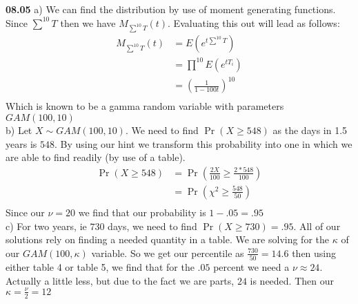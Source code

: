 {\bf 08.05} a) We can find the distribution by use of moment generating functions. Since $\sum^{10} T$ then we
have $M_{\sum^{10} T} (t)$. Evaluating this out will lead as follows:
\begin{align*}
	M_{\sum^{10} T} (t) & = E \left( e^{t \sum^{10} T} \right) \\
	& = \prod^{10} E \left( e^{ t T_{i}} \right) \\
	& = \left( \frac{1}{1-100t} \right)^{10} \\
\end{align*}
Which is known to be a gamma random variable with parameters $GAM(100,10)$ \\

b) Let $X \sim GAM(100,10)$.
We need to find $\Pr \left( X \geq 548 \right)$ as the days in 1.5 years is $548$. By using our hint we transform
this probability into one in which we are able to find readily (by use of a table). \\

\begin{align*}
	\Pr \left( X \geq 548 \right) & = \Pr \left( \frac{2 X}{100} \geq \frac{2 * 548}{100} \right) \\
	& = \Pr \left( \chi^2 \geq \frac{548}{50} \right) \\
\end{align*}
Since our $\nu = 20$ we find that our probability is $1 - .05 = .95$ \\

c) For two years, ie $730$ days, we need to find $\Pr \left( X \geq 730 \right) = .95$. All of our solutions
rely on finding a needed quantity in a table. We are solving for the $\kappa$ of our $GAM(100,\kappa)$ variable.
So we get our percentile as $\frac{730}{50} = 14.6$ then using either table 4 or table 5, we find that for the
$.05$ percent we need a $\nu \approx 24$. Actually a little less, but due to the fact we are parts, $24$ is
needed. Then our $\kappa = \frac{\nu}{2} = 12$
\\
